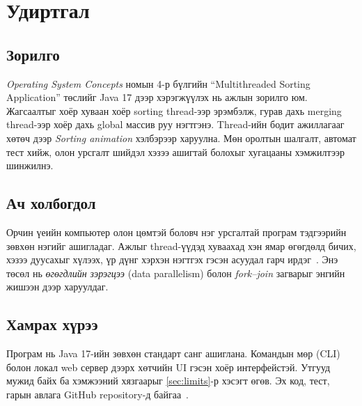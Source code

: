 \chapter{Удиртгал}\label{ch:intro}

\section{Зорилго}
\emph{Operating System Concepts} номын 4-р бүлгийн “Multithreaded Sorting Application” төслийг Java 17 дээр
хэрэгжүүлэх нь ажлын зорилго юм. Жагсаалтыг хоёр хуваан хоёр sorting thread-ээр эрэмбэлж, гурав дахь merging
thread-ээр хоёр дахь global массив руу нэгтгэнэ. Thread-ийн бодит ажиллагааг хөтөч дээр \emph{Sorting animation}
хэлбэрээр харуулна. Мөн оролтын шалгалт, автомат тест хийж, олон урсгалт шийдэл хэзээ ашигтай болохыг хугацааны
хэмжилтээр шинжилнэ.

\section{Ач холбогдол}
Орчин үеийн компьютер олон цөмтэй боловч нэг урсгалтай програм тэдгээрийн зөвхөн нэгийг ашигладаг. Ажлыг
thread-үүдэд хуваахад хэн ямар өгөгдөлд бичих, хэзээ дуусахыг хүлээх, үр дүнг хэрхэн нэгтгэх гэсэн асуудал
гарч ирдэг~\cite{osc10}. Энэ төсөл нь \emph{өгөгдлийн зэрэгцээ} (data parallelism) болон \emph{fork--join}
загварыг энгийн жишээн дээр харуулдаг.

\section{Хамрах хүрээ}
Програм нь Java 17-ийн зөвхөн стандарт санг ашиглана. Командын мөр (CLI) болон локал web сервер дээрх хөтчийн
UI гэсэн хоёр интерфейстэй. Утгууд  мужид байх ба хэмжээний хязгаарыг \ref{sec:limits}-р хэсэгт өгөв.
Эх код, тест, гарын авлага GitHub repository-д байгаа~\cite{repo}.
